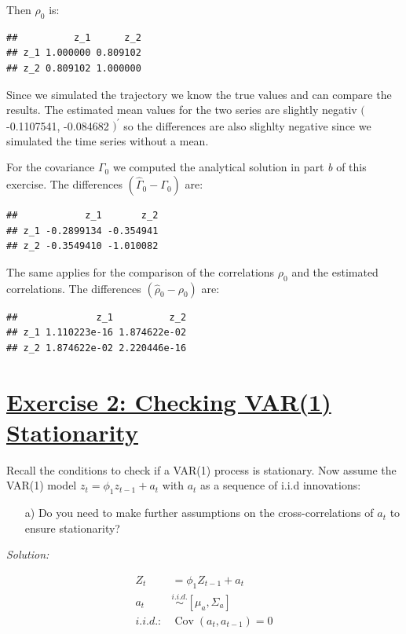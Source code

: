 \documentclass[12pt,a4paper]{article}
\newcommand{\Cov}{\operatorname{Cov}}
\newcommand{\tmpsection}[1]{}
\let\tmpsection=\section
\renewcommand{\section}[1]{\tmpsection{\underline{#1}} }
\begin{document}
Then \(\rho_0\) is:

\begin{verbatim}
##          z_1      z_2
## z_1 1.000000 0.809102
## z_2 0.809102 1.000000
\end{verbatim}

Since we simulated the trajectory we know the true values and can
compare the results. The estimated mean values for the two series are
slightly negativ \((\)-0.1107541, -0.084682 \()^{'}\) so the differences
are also slighlty negative since we simulated the time series without a
mean.

For the covariance \(\Gamma_0\) we computed the analytical solution in
part \emph{b} of this exercise. The differences
\((\widehat{\Gamma}_0 - \Gamma_0)\) are:

\begin{verbatim}
##            z_1       z_2
## z_1 -0.2899134 -0.354941
## z_2 -0.3549410 -1.010082
\end{verbatim}

The same applies for the comparison of the correlations \(\rho_0\) and
the estimated correlations. The differences
\((\widehat{\rho}_0 - \rho_0 )\) are:

\begin{verbatim}
##              z_1          z_2
## z_1 1.110223e-16 1.874622e-02
## z_2 1.874622e-02 2.220446e-16
\end{verbatim}

\hypertarget{exercise-2-checking-var1-stationarity}{%
\section{Exercise 2: Checking VAR(1)
Stationarity}\label{exercise-2-checking-var1-stationarity}}

Recall the conditions to check if a VAR(1) process is stationary. Now
assume the VAR(1) model \(z_{t} = \phi_{1} z_{t-1} + a_{t}\) with
\(a_{t}\) as a sequence of i.i.d innovations:

\begin{itemize}
\item[a)] Do you need to make further assumptions on the cross-correlations of $a_{t}$ to ensure stationarity?
\end{itemize}

\emph{Solution:}

\begin{align*}
  Z_t & = \phi_1 Z_{t-1} + a_t\\
  a_t & \overset{i.i.d.}{\sim} \left[ \mu_a , \Sigma_a \right]\\
  i.i.d.: & \Cov (a_t , a_{t-1}) = 0
\end{align*}
\end{document}
